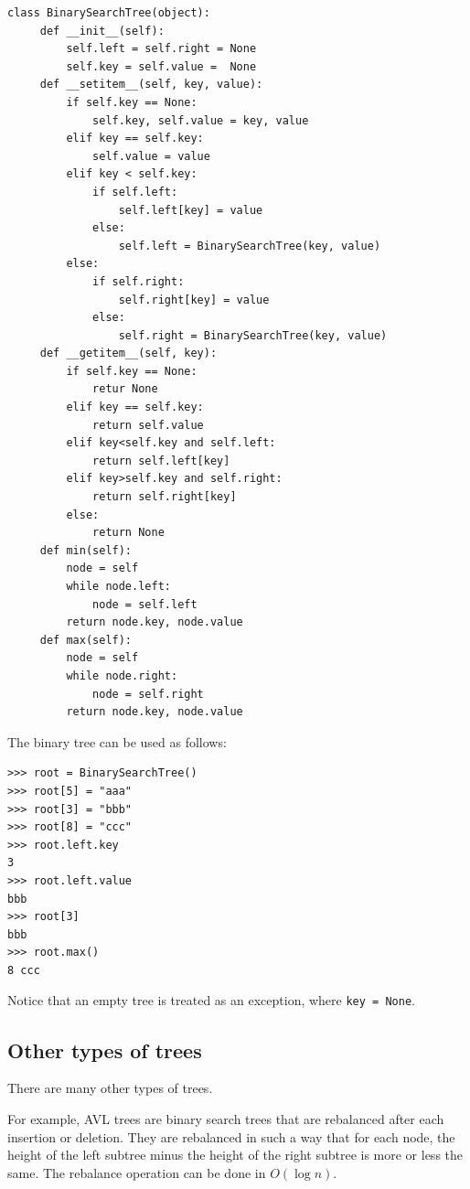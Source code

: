 \documentclass[justified, sixbynine]{tufte-book}
\def\ft{\small\tt}
\theoremstyle{plain}%
\newtheorem * {corollary}{Corollary}
\theoremstyle{definition}
\theoremstyle{remark}
\newtheorem * {remark}{Remark}
\newtheorem * {note}{Note}
\begin{document}
\begin{fullwidth}
\begin{lstlisting}
class BinarySearchTree(object):
     def __init__(self):
         self.left = self.right = None
         self.key = self.value =  None
     def __setitem__(self, key, value):
         if self.key == None:
             self.key, self.value = key, value
         elif key == self.key:
             self.value = value
         elif key < self.key:
             if self.left:
                 self.left[key] = value
             else:
                 self.left = BinarySearchTree(key, value)
         else:
             if self.right:
                 self.right[key] = value
             else:
                 self.right = BinarySearchTree(key, value)
     def __getitem__(self, key):
         if self.key == None:
             retur None
         elif key == self.key:
             return self.value
         elif key<self.key and self.left:
             return self.left[key]
         elif key>self.key and self.right:
             return self.right[key]
         else:
             return None
     def min(self):
         node = self
         while node.left:
             node = self.left
         return node.key, node.value
     def max(self):
         node = self
         while node.right:
             node = self.right
         return node.key, node.value
\end{lstlisting}

The binary tree can be used as follows:

\begin{lstlisting}
>>> root = BinarySearchTree()
>>> root[5] = "aaa"
>>> root[3] = "bbb"
>>> root[8] = "ccc"
>>> root.left.key
3
>>> root.left.value
bbb
>>> root[3]
bbb
>>> root.max()
8 ccc
\end{lstlisting}

Notice that an empty tree is treated as an exception, where {\ft key = None}.

\goodbreak\subsection{Other types of trees}

There are many other types of trees. 

For example, AVL trees are binary search trees that are rebalanced after each
insertion or deletion. They are rebalanced in such a way that for each node, the
height of the left subtree minus the height of the right subtree is more or less the same. The rebalance operation can be done in $O(\log n)$.


\end{fullwidth}
\end{document}
